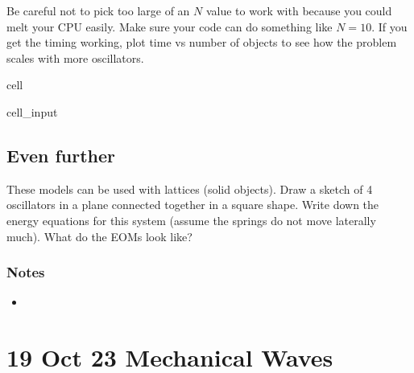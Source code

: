 \documentclass[letterpaper,10pt,english]{jupyterBook}
\begin{document}
\sphinxAtStartPar
Be careful not to pick too large of an \(N\) value to work with because you could melt your CPU easily. Make sure your code can do something like \(N=10\). If you get the timing working, plot time vs number of objects to see how the problem scales with more oscillators.

\begin{sphinxuseclass}{cell}\begin{sphinxVerbatimInput}

\begin{sphinxuseclass}{cell_input}
\begin{sphinxVerbatim}[commandchars=\\\{\}]
\end{sphinxVerbatim}

\end{sphinxuseclass}\end{sphinxVerbatimInput}

\end{sphinxuseclass}

\section{Even further}
\label{\detokenize{content/3_waves/normal_modes:even-further}}
\sphinxAtStartPar
These models can be used with lattices (solid objects). Draw a sketch of 4 oscillators in a plane connected together in a square shape. Write down the energy equations for this system (assume the springs do not move laterally much). What do the EOMs look like?


\subsection{Notes}
\label{\detokenize{content/3_waves/normal_modes:notes}}\begin{itemize}
\item {} 
\sphinxAtStartPar
{}

\end{itemize}

\sphinxstepscope


\chapter{19 Oct 23 \sphinxhyphen{} Mechanical Waves}
\label{\detokenize{content/3_waves/mech_waves:oct-23-mechanical-waves}}\label{\detokenize{content/3_waves/mech_waves::doc}}
\sphinxstepscope
\end{document}
